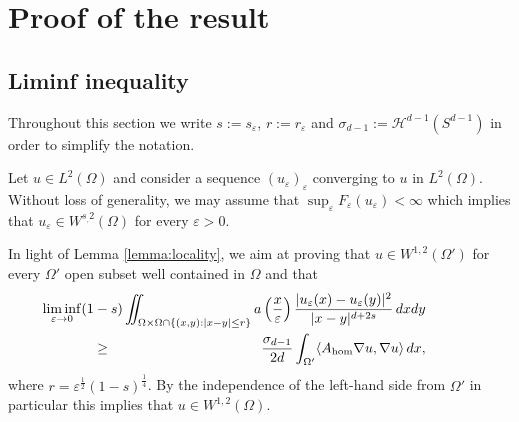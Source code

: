 \documentclass[11pt,a4paper,reqno]{amsart}
\theoremstyle{plain}
\theoremstyle{definition}
\newcommand\e{\varepsilon}
\theoremstyle{remark}
\begin{document}
\section{Proof of the result}

\subsection{\bf Liminf inequality}
Throughout this section we write $s:=s_\e$, $r:=r_\e$ and $\sigma_{d-1}:=\mathcal{H}^{d-1}(S^{d-1})$ in order to simplify the notation.

Let $u\in L^{2}(\Omega)$ and consider a sequence $(u_\e)_\e$ converging to $u$ in $L^2(\Omega)$. Without loss of generality, we may assume that $\sup_\e F_{\e}(u_\e)< \infty$ which implies that $u_\e\in W^{s_,2}(\Omega)$ for every $\e>0$. 

In light of Lemma \ref{lemma:locality}, we aim at proving that $u\in 
W^{1,2}(\Omega')$ for every $\Omega'$ open subset well contained in $\Omega$ and that
\begin{eqnarray*}\label{mainclaim}
   &&\hskip-2cm\liminf_{\e\to0} (1-s) \iint_{\Omega\times \Omega \cap \{(x,y) : |x-y|\leq r\}}a\left(\frac{x}{\e}\right) \frac{|u_\e(x)-u_\e(y)|^2}{|x-y|^{d+2s}}\,dxdy \\
   &\geq& \frac{\sigma_{d-1}}{2d}\int_{\Omega'} \langle A_{\rm hom}\nabla  u,\nabla u\rangle\,dx,
\end{eqnarray*}
 where $r=\e^{\frac{1}{2}}(1-s)^{\frac{1}{4}}$. By the independence of the left-hand side from $\Omega'$ in particular this implies that $u\in W^{1,2}(\Omega)$.
\end{document}
